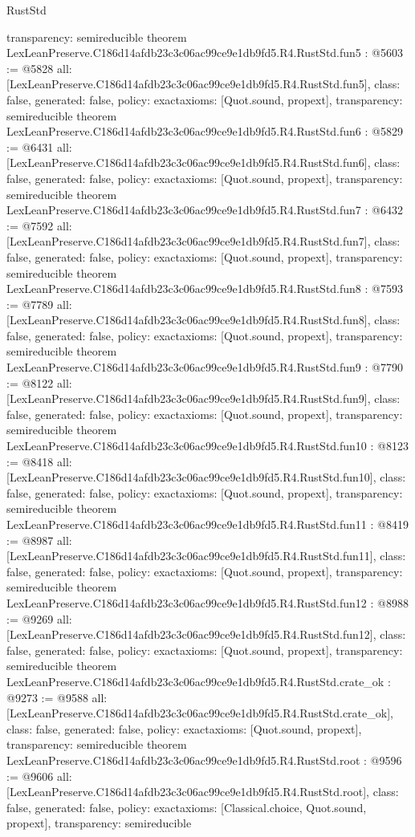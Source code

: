 \begin{lexlean}{RustStd}
\begin{coremodule}
{  transparency: semireducible
}
theorem LexLeanPreserve.C186d14afdb23c3c06ac99ce9e1db9fd5.R4.RustStd.fun5 : @5603 := @5828 {
  all: [LexLeanPreserve.C186d14afdb23c3c06ac99ce9e1db9fd5.R4.RustStd.fun5],
  class: false,
  generated: false,
  policy: exact{axioms: [Quot.sound, propext]},
  transparency: semireducible
}
theorem LexLeanPreserve.C186d14afdb23c3c06ac99ce9e1db9fd5.R4.RustStd.fun6 : @5829 := @6431 {
  all: [LexLeanPreserve.C186d14afdb23c3c06ac99ce9e1db9fd5.R4.RustStd.fun6],
  class: false,
  generated: false,
  policy: exact{axioms: [Quot.sound, propext]},
  transparency: semireducible
}
theorem LexLeanPreserve.C186d14afdb23c3c06ac99ce9e1db9fd5.R4.RustStd.fun7 : @6432 := @7592 {
  all: [LexLeanPreserve.C186d14afdb23c3c06ac99ce9e1db9fd5.R4.RustStd.fun7],
  class: false,
  generated: false,
  policy: exact{axioms: [Quot.sound, propext]},
  transparency: semireducible
}
theorem LexLeanPreserve.C186d14afdb23c3c06ac99ce9e1db9fd5.R4.RustStd.fun8 : @7593 := @7789 {
  all: [LexLeanPreserve.C186d14afdb23c3c06ac99ce9e1db9fd5.R4.RustStd.fun8],
  class: false,
  generated: false,
  policy: exact{axioms: [Quot.sound, propext]},
  transparency: semireducible
}
theorem LexLeanPreserve.C186d14afdb23c3c06ac99ce9e1db9fd5.R4.RustStd.fun9 : @7790 := @8122 {
  all: [LexLeanPreserve.C186d14afdb23c3c06ac99ce9e1db9fd5.R4.RustStd.fun9],
  class: false,
  generated: false,
  policy: exact{axioms: [Quot.sound, propext]},
  transparency: semireducible
}
theorem LexLeanPreserve.C186d14afdb23c3c06ac99ce9e1db9fd5.R4.RustStd.fun10 : @8123 := @8418 {
  all: [LexLeanPreserve.C186d14afdb23c3c06ac99ce9e1db9fd5.R4.RustStd.fun10],
  class: false,
  generated: false,
  policy: exact{axioms: [Quot.sound, propext]},
  transparency: semireducible
}
theorem LexLeanPreserve.C186d14afdb23c3c06ac99ce9e1db9fd5.R4.RustStd.fun11 : @8419 := @8987 {
  all: [LexLeanPreserve.C186d14afdb23c3c06ac99ce9e1db9fd5.R4.RustStd.fun11],
  class: false,
  generated: false,
  policy: exact{axioms: [Quot.sound, propext]},
  transparency: semireducible
}
theorem LexLeanPreserve.C186d14afdb23c3c06ac99ce9e1db9fd5.R4.RustStd.fun12 : @8988 := @9269 {
  all: [LexLeanPreserve.C186d14afdb23c3c06ac99ce9e1db9fd5.R4.RustStd.fun12],
  class: false,
  generated: false,
  policy: exact{axioms: [Quot.sound, propext]},
  transparency: semireducible
}
theorem LexLeanPreserve.C186d14afdb23c3c06ac99ce9e1db9fd5.R4.RustStd.crate_ok : @9273 := @9588 {
  all: [LexLeanPreserve.C186d14afdb23c3c06ac99ce9e1db9fd5.R4.RustStd.crate_ok],
  class: false,
  generated: false,
  policy: exact{axioms: [Quot.sound, propext]},
  transparency: semireducible
}
theorem LexLeanPreserve.C186d14afdb23c3c06ac99ce9e1db9fd5.R4.RustStd.root : @9596 := @9606 {
  all: [LexLeanPreserve.C186d14afdb23c3c06ac99ce9e1db9fd5.R4.RustStd.root],
  class: false,
  generated: false,
  policy: exact{axioms: [Classical.choice, Quot.sound, propext]},
  transparency: semireducible
}


\end{coremodule}
\end{lexlean}
